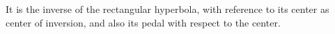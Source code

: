 \begin{enumerate}
%
%
%
%
%
%
%
%
%
%
%
%
%
%
%
%
%
%
%
%
%
%
%
%
%
%
%
%
%
%
%
%
%
%
%
    It is the inverse of the rectangular hyperbola, with reference to its center
    as center of inversion, and also its pedal with respect to the center.



\end{enumerate}
